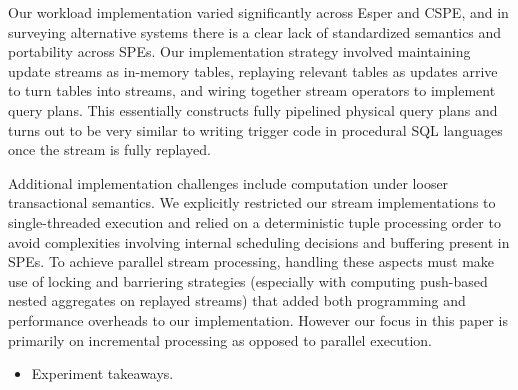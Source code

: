 Our workload implementation varied significantly across Esper and CSPE, and in
surveying alternative systems there is a clear lack of standardized semantics
and portability across SPEs. Our implementation strategy involved maintaining
update streams as in-memory tables, replaying relevant tables as updates arrive
to turn tables into streams, and wiring together stream operators to implement
query plans. This essentially constructs fully pipelined physical query
plans and turns out to be very similar to writing trigger code in procedural SQL
languages once the stream is fully replayed.

Additional implementation challenges include computation under looser
transactional semantics. We explicitly restricted our stream implementations to
single-threaded execution and relied on a deterministic tuple processing order
to avoid complexities involving internal scheduling decisions and buffering
present in SPEs. To achieve parallel stream processing, handling these aspects
must make use of locking and barriering strategies (especially with computing
push-based nested aggregates on replayed streams) that added both programming
and performance overheads to our implementation. However our focus in this paper
is primarily on incremental processing as opposed to parallel execution.

\begin{itemize}
  \item Experiment takeaways.
\end{itemize}


